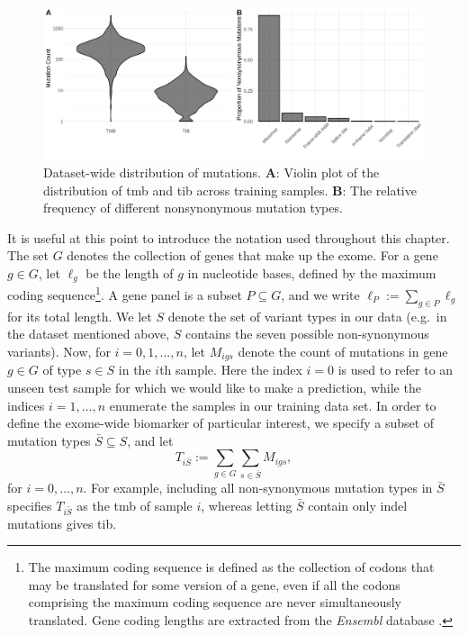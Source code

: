 \documentclass[../thesis.tex]{subfiles}
\begin{document}
\begin{figure}[htbp]
\centering
\includegraphics[width=6in]{../figures/chapter3/fig2.png}
\vspace*{-5mm}
\caption{Dataset-wide distribution of mutations. \textbf{A}: Violin plot of the distribution of \gls{tmb} and \gls{tib} across training samples. \textbf{B}: The relative frequency of different nonsynonymous mutation types. \label{fig:2}}
\vspace*{-2mm}
\end{figure}

It is useful at this point to introduce the notation used throughout this chapter. The set $G$ denotes the collection of genes that make up the exome. For a gene $g \in G$, let $\ell_g$ be the length of $g$ in nucleotide bases, defined by the maximum coding sequence\footnote{The maximum coding sequence is defined as the collection of codons that may be translated for some version of a gene, even if all the codons comprising the maximum coding sequence are never simultaneously translated. Gene coding lengths are extracted from the \emph{Ensembl} database \citep{yates_ensembl_2020}.}.  A gene panel is a subset $P \subseteq G$, and we write $\ell_P := \sum_{g \in P} \ell_g$ for its total length. We let $S$ denote the set of variant types in our data (e.g.~in the dataset mentioned above, $S$ contains the seven possible non-synonymous variants). Now, for $i = 0, 1, \ldots, n$, let $M_{igs}$ denote the count of mutations in gene $g \in G$ of type $s \in S$ in the $i$th sample. Here the index $i=0$ is used to refer to an unseen test sample for which we would like to make a prediction, while the indices $i=1,\ldots,n$ enumerate the samples in our training data set.  In order to define the exome-wide biomarker of particular interest, we specify a subset of mutation types $\bar{S} \subseteq S$, and let
\begin{equation}
T_{i\bar{S}} := \sum_{g \in G} \sum_{s \in \bar{S}} M_{igs},
\label{eq:biomarker}
\end{equation}
for $i=0,\ldots, n$.  For example, including all non-synonymous mutation types in $\bar{S}$ specifies $T_{i\bar{S}}$ as the \gls{tmb} of sample $i$, whereas letting $\bar{S}$ contain only indel mutations gives \gls{tib}. 
\end{document}
